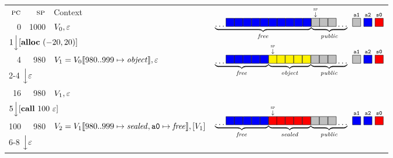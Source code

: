 \documentclass[10pt,conference]{ieeetran}%
\theoremstyle{definition}
\begin{document}
\begin{figure}
  \begin{tabular}{|r|r||l|r}
    \cline{1-3}
    \(\textsc{pc}\) & \(\textsc{sp}\) & Context &
    \multirow{3}{*}{\(\underbrace{\dots \freebox \freebox \freebox \freebox \freebox
        \freebox \freebox \freebox \freebox \freebox}_\unsealed
      \! \underbrace{\stackrel{\stackrel{\SP}{\downarrow}}{\pubbox} \!\! \pubbox \pubbox \dots}_\public
      ~ \stackrel{\mathtt{a1}}{\pubbox} ~ \stackrel{\mathtt{a2}}{\freebox}
      ~ \stackrel{\mathtt{s0}}{\sealbox}
      \)} \\
    \cline{1-3}
    0 & 1000 & \(V_0, \varepsilon\)
    \\
    \cline{1-3}
    \multicolumn{3}{l}{\multirow{2}{*}{\(1 \Big\downarrow [\mathbf{alloc} ~ (-20,20)]\)}} & \\
    \multicolumn{3}{l}{} &
    \multirow{3}{*}{\(\underbrace{\dots \freebox \freebox \freebox \freebox \freebox}_\unsealed
      \! \underbrace{\stackrel{\stackrel{\SP}{\downarrow}}{\objbox} \!\! \objbox \objbox \objbox \objbox}_\object
      \! \underbrace{\pubbox \pubbox \pubbox \dots}_\public
      ~ \stackrel{\mathtt{a1}}{\pubbox} ~ \stackrel{\mathtt{a2}}{\freebox}
      ~ \stackrel{\mathtt{s0}}{\sealbox}
      \)}
    \\
    \cline{1-3}
    4 & 980 & \(V_1 = V_0 \llbracket 980..999 \mapsto \mathit{object}\rrbracket, \varepsilon\) &
    \\
    \cline{1-3}
    \multicolumn{3}{l}{\multirow{2}{*}{2-4 \(\Big\downarrow \varepsilon\)}} \\ \multicolumn{3}{l}{} \\
    \cline{1-3}
    16 & 980 & \(V_1, \varepsilon\) & \\
    \cline{1-3}
    \multicolumn{3}{l}{\multirow{2}{*}{\(5 \Big\downarrow [\mathbf{call} ~ 100 ~ \varepsilon]\)}} & \\
    \multicolumn{3}{l}{} &
    \multirow{3}{*}{\(\underbrace{\dots \freebox \freebox \freebox \freebox \freebox}_\unsealed
      \! \underbrace{\stackrel{\stackrel{\SP}{\downarrow}}{\sealbox} \!\! \sealbox \sealbox \sealbox \sealbox}_\sealed
      \! \underbrace{\pubbox \pubbox \pubbox \dots}_\public
      ~ \stackrel{\mathtt{a1}}{\freebox} ~ \stackrel{\mathtt{a2}}{\freebox}
      ~ \stackrel{\mathtt{s0}}{\sealbox}
      \)}
    \\
    \cline{1-3}
    100 & 980 & \(V_2 = V_1 \llbracket 980..999 \mapsto \mathit{sealed}, \mathtt{a0} \mapsto \mathit{free}\rrbracket,[V_1]\) & \\
    \cline{1-3}
    \multicolumn{3}{l}{\multirow{2}{*}{6-8 \(\Big\downarrow \varepsilon\)}} \\ \multicolumn{3}{l}{} \\

\end{tabular}
\end{figure}
\end{document}
